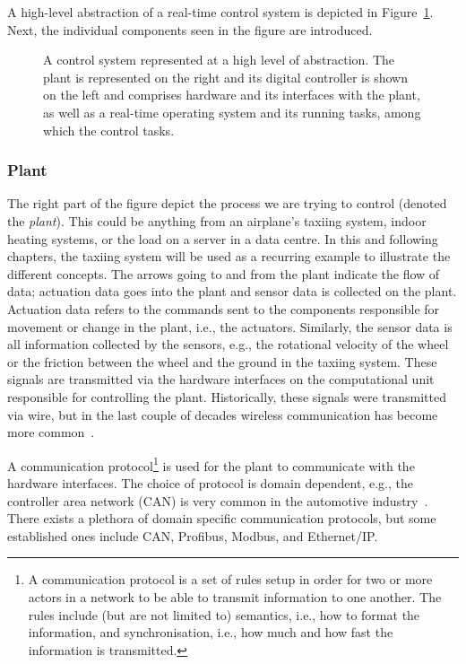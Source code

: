 A high-level abstraction of a real-time control system is depicted in Figure~\ref{fig:high-level-abstraction}.
Next, the individual components seen in the figure are introduced. 
%
\begin{figure}[t]
    \centering
    \caption{A control system represented at a high level of abstraction. The plant is represented on the right and its digital controller is shown on the left and comprises hardware and its interfaces with the plant, as well as a real-time operating system and its running tasks, among which the control tasks.}%
    \label{fig:high-level-abstraction}%
\end{figure}

\subsubsection{Plant}%
%
The right part of the figure depict the process we are trying to control (denoted the \emph{plant}).
This could be anything from an airplane's taxiing system, indoor heating systems, or the load on a server in a data centre.
In this and following chapters, the taxiing system will be used as a recurring example to illustrate the different concepts.
The arrows going to and from the plant indicate the flow of data; actuation data goes into the plant and sensor data is collected on the plant.
Actuation data refers to the commands sent to the components responsible for movement or change in the plant, i.e., the actuators.
Similarly, the sensor data is all information collected by the sensors, e.g., the rotational velocity of the wheel or the friction between the wheel and the ground in the taxiing system.
These signals are transmitted via the hardware interfaces on the computational unit responsible for controlling the plant.
Historically, these signals were transmitted via wire, but in the last couple of decades wireless communication has become more common~\addref{}.

A communication protocol\footnote{A communication protocol is a set of rules setup in order for two or more actors in a network to be able to transmit information to one another. The rules include (but are not limited to) semantics, i.e., how to format the information, and synchronisation, i.e., how much and how fast the information is transmitted.} is used for the plant to communicate with the hardware interfaces.
The choice of protocol is domain dependent, e.g., the controller area network (CAN) is very common in the automotive industry~\addref{}.
There exists a plethora of domain specific communication protocols, but some established ones include CAN, Profibus, Modbus, and Ethernet/IP.

